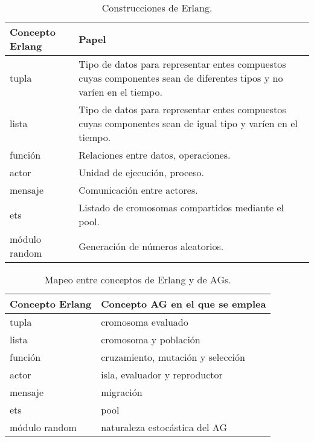 \begin{table}
  \centering
   \caption{Construcciones de Erlang.}\label{erlComp}
\begin{tabular}{|p{3.4cm}|p{7cm}|}
  \hline
  \textbf{Concepto Erlang} & \textbf{Papel} \\
     \hline
  tupla & Tipo de datos para representar entes compuestos cuyas componentes sean de diferentes tipos y no varíen en el tiempo. \\
     \hline
  lista & Tipo de datos para representar entes compuestos cuyas componentes sean de igual tipo y varíen en el tiempo.\\
     \hline
  función & Relaciones entre datos, operaciones. \\
     \hline
  actor & Unidad de ejecución, proceso. \\
     \hline
  mensaje & Comunicación entre actores. \\
     \hline
  ets & Listado de cromosomas compartidos mediante el pool. \\
     \hline
  módulo random & Generación de números aleatorios.\\
  \hline
\end{tabular}

\end{table}

\begin{table}
  \centering
  \caption{Mapeo entre conceptos de Erlang y de AGs.}\label{erlAGRelation}
\begin{tabular}{|p{3cm}|p{6cm}|}
  \hline
  \textbf{Concepto Erlang} & \textbf{Concepto AG en el que se emplea} \\
     \hline
  tupla & cromosoma evaluado \\
     \hline
  lista & cromosoma y población \\
     \hline
  función & cruzamiento, mutación y selección \\
     \hline
  actor  & isla, evaluador y reproductor \\
     \hline
  mensaje & migración \\
     \hline
  ets & pool \\
     \hline
  módulo random & naturaleza estocástica del AG \\
  \hline
\end{tabular}

\end{table}

